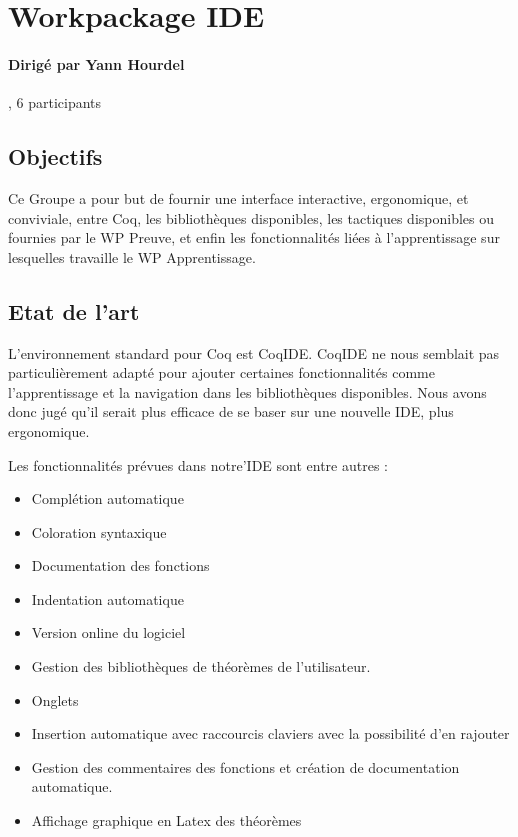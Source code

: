 \documentclass[a4paper,10pt]{article}
\begin{document}
\section{Workpackage IDE}

\paragraph{Dirigé par Yann Hourdel}, 6 participants

\subsection{Objectifs} Ce Groupe a pour but de fournir une interface interactive, ergonomique, et conviviale, entre Coq, les bibliothèques disponibles, les tactiques disponibles ou fournies par le WP Preuve, et enfin les fonctionnalités liées à l'apprentissage sur lesquelles travaille le WP Apprentissage.

\subsection{Etat de l'art} L'environnement standard pour Coq est CoqIDE. 
 CoqIDE ne nous semblait pas particulièrement adapté pour ajouter certaines fonctionnalités comme l'apprentissage et
 la navigation dans les bibliothèques disponibles.
Nous avons donc jugé qu'il serait plus efficace de se baser sur une nouvelle IDE, plus ergonomique.

Les fonctionnalités prévues dans notre'IDE sont entre autres :
   \begin{itemize}
   \item Complétion automatique
   \item Coloration syntaxique
   \item Documentation des fonctions
   \item Indentation automatique
   \item Version online du logiciel
   \item Gestion des bibliothèques de théorèmes de l'utilisateur.
   \item Onglets
   \item Insertion automatique avec raccourcis claviers avec la possibilité d'en rajouter
   \item Gestion des commentaires des fonctions et création de documentation automatique.
   \item Affichage graphique en Latex des théorèmes
\end{itemize}
\end{document}
